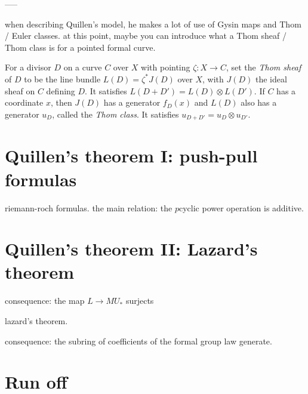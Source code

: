 -----

when describing Quillen's model, he makes a lot of use of Gysin maps and Thom / Euler classes. at this point, maybe you can introduce what a Thom sheaf / Thom class is for a pointed formal curve.

\begin{definition}
For a divisor $D$ on a curve $C$ over $X$ with pointing $\zeta: X \to C$, set the \textit{Thom sheaf} of $D$ to be the line bundle $L(D) = \zeta^* J(D)$ over $X$, with $J(D)$ the ideal sheaf on $C$ defining $D$.  It satisfies $L(D + D') = L(D) \otimes L(D')$.  If $C$ has a coordinate $x$, then $J(D)$ has a generator $f_D(x)$ and $L(D)$ also has a generator $u_D$, called the \textit{Thom class}.  It satisfies $u_{D + D'} = u_D \otimes u_{D'}$.
\end{definition}






\section{Quillen's theorem I: push-pull formulas}

riemann-roch formulas.  the main relation: the $p$\th cyclic power operation is additive.



\section{Quillen's theorem II: Lazard's theorem}

consequence: the map $L \to MU_*$ surjects

lazard's theorem.

consequence: the subring of coefficients of the formal group law generate.














\section*{Run off}









